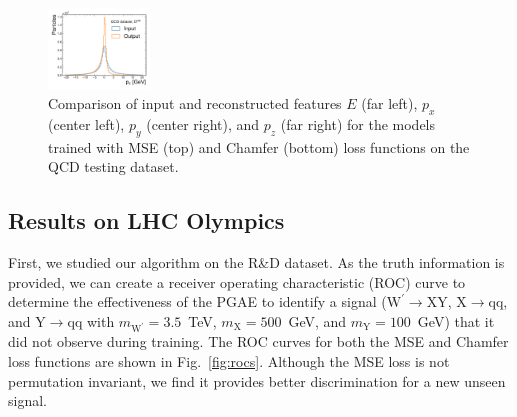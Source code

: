 \documentclass[letterpaper,11pt]{article}
\newcommand{\PWpr}{\ensuremath{\mathrm{W}^{\prime}}\xspace} %
\newcommand{\PX}{\ensuremath{\mathrm{X}}\xspace} %
\newcommand{\PY}{\ensuremath{\mathrm{Y}}\xspace} %
\newcommand{\Pq}{\ensuremath{\mathrm{q}}\xspace} %
\begin{document}
\begin{figure}[htpb]
\includegraphics[width=0.24\textwidth]{figures/gae_sparseloss/GNN_AE_EdgeConv_$p_z$.pdf}
\caption{Comparison of input and reconstructed features $E$ (far left), $p_x$ (center left), $p_y$ (center right), and $p_z$ (far right) for the models trained with MSE (top) and Chamfer (bottom) loss functions on the QCD testing dataset.
}
\label{fig:reconstruction}
\end{figure}

\subsection{Results on LHC Olympics}


First, we studied our algorithm on the R\&D dataset.
As the truth information is provided, we can create a receiver operating characteristic (ROC) curve to determine the effectiveness of the PGAE to identify a signal ($\PWpr\to\PX\PY$, $\PX\to\Pq\Pq$, and $\PY\to\Pq\Pq$ with $m_{\PWpr} = 3.5$~TeV, $m_\PX = 500$~GeV, and $m_\PY= 100$~GeV) that it did not observe during training.
The ROC curves for both the MSE and Chamfer loss functions are shown in Fig.~\ref{fig:rocs}.
Although the MSE loss is not permutation invariant, we find it provides better discrimination for a new unseen signal.
\end{document}
